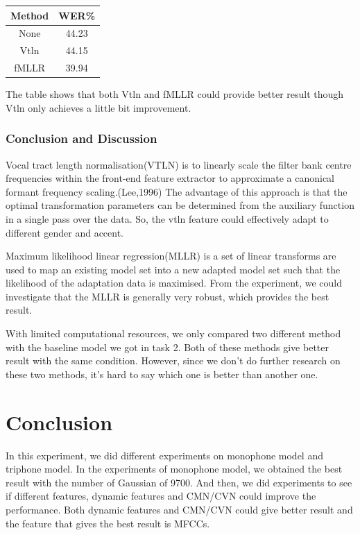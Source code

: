 \documentclass[]{article}
\begin{document}
\begin{multicols*}{2}
\begin{center}
\begin{tabular}{c c}
\toprule
Method & WER\%  \\
\midrule
None & 44.23 \\
Vtln & 44.15 \\
fMLLR & 39.94 \\
\bottomrule
\end{tabular}
\end{center}

The table shows that both Vtln and fMLLR could provide better result though Vtln only achieves a little bit improvement.

\subsubsection{Conclusion and Discussion} 

Vocal tract length normalisation(VTLN) is to linearly scale the filter bank centre frequencies within the front-end feature extractor to approximate a canonical formant frequency scaling.(Lee,1996) The advantage of this approach is that the optimal transformation parameters can be determined from the auxiliary function in a single pass over the data. So, the vtln feature could effectively adapt to different gender and accent.

Maximum likelihood linear regression(MLLR) is a set of linear transforms are used to map an existing model set into a new adapted model set such that the likelihood of the adaptation data is maximised. From the experiment, we could investigate that the MLLR is generally very robust, which provides the best result.

With limited computational resources, we only compared two different method with the baseline model we got in task 2. Both of these methods give better result with the same condition. However, since we don't do further research on these two methods, it's hard to say which one is better than another one.

\section{Conclusion}

In this experiment, we did different experiments on monophone model and triphone model. In the experiments of monophone model, we obtained the best result with the number of Gaussian of 9700. And then, we did experiments to see if different features, dynamic features and CMN/CVN could improve the performance. Both dynamic features and CMN/CVN could give better result and the feature that gives the best result is MFCCs.


\end{multicols*}
\end{document}
